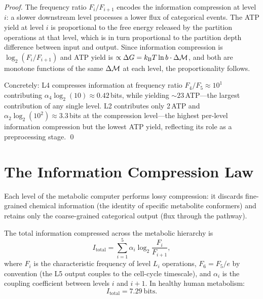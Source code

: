\begin{proof}
The frequency ratio $F_i/F_{i+1}$ encodes the information compression at
level $i$: a slower downstream level processes a lower flux of categorical
events. The ATP yield at level $i$ is proportional to the free energy
released by the partition operations at that level, which is in turn
proportional to the partition depth difference between input and output.
Since information compression is $\log_2(F_i/F_{i+1})$ and ATP yield is
$\propto \Delta G = k_{\mathrm{B}} T \ln b \cdot \Delta\mathcal{M}$, and both are monotone
functions of the same $\Delta\mathcal{M}$ at each level, the proportionality
follows.

Concretely: L4 compresses information at frequency ratio $F_4/F_5 \approx
10^1$ contributing $\alpha_4 \log_2(10) \approx 0.42$\,bits, while yielding
$\sim 23$\,ATP---the largest contribution of any single level. L2 contributes
only 2\,ATP and $\alpha_2 \log_2(10^2) \approx 3.3$\,bits at the compression
level---the highest per-level information compression but the lowest ATP yield,
reflecting its role as a preprocessing stage. \qed
\end{proof}

\section{The Information Compression Law}
\label{sec:information_compression}

Each level of the metabolic computer performs lossy compression: it discards
fine-grained chemical information (the identity of specific metabolite
conformers) and retains only the coarse-grained categorical output (flux
through the pathway).

\begin{theorem}
\label{thm:compression}
The total information compressed across the metabolic hierarchy is
\begin{equation}
  I_{\mathrm{total}} = \sum_{i=1}^{5} \alpha_i \log_2 \frac{F_i}{F_{i+1}},
  \label{eq:information_compression}
\end{equation}
where $F_i$ is the characteristic frequency of level $L_i$ operations,
$F_6 = F_5 / e$ by convention (the L5 output couples to the cell-cycle
timescale), and $\alpha_i$ is the coupling coefficient between levels $i$
and $i+1$.
In healthy human metabolism:
\begin{equation}
  I_{\mathrm{total}} = 7.29\ \mathrm{bits}.
  \label{eq:healthy_information}
\end{equation}
\end{theorem}

